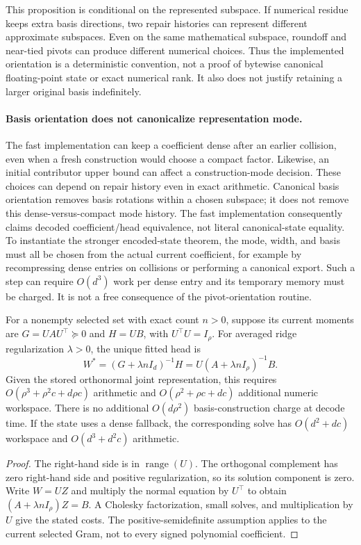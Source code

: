This proposition is conditional on the represented subspace. If numerical
residue keeps extra basis directions, two repair histories can represent
different approximate subspaces. Even on the same mathematical subspace,
roundoff and near-tied pivots can produce different numerical choices.
Thus the implemented orientation is a deterministic convention, not a
proof of bytewise canonical floating-point state or exact numerical rank.
It also does not justify retaining a larger original basis indefinitely.

\paragraph{Basis orientation does not canonicalize representation mode.}
The fast implementation can keep a coefficient dense after an earlier
collision, even when a fresh construction would choose a compact factor.
Likewise, an initial contributor upper bound can affect a construction-mode
decision. These choices can depend on repair history even in exact
arithmetic. Canonical basis orientation removes basis rotations within a
chosen subspace; it does not remove this dense-versus-compact mode history.
The fast implementation consequently claims decoded coefficient/head
equivalence, not literal canonical-state equality. To instantiate the
stronger encoded-state theorem, the mode, width, and basis must all be
chosen from the actual current coefficient, for example by recompressing
dense entries on collisions or performing a canonical export. Such a step
can require $O(d^3)$ work per dense entry and its temporary memory must be
charged. It is not a free consequence of the pivot-orientation routine.

\begin{proposition}
For a nonempty selected set with exact count $n>0$, suppose its current
moments are $G=UAU^\top\succeq0$ and $H=UB$, with $U^\top U=I_\rho$.
For averaged ridge regularization $\lambda>0$, the unique fitted head is
\[
 W^*=(G+\lambda nI_d)^{-1}H
     =U(A+\lambda nI_\rho)^{-1}B.
\]
Given the stored orthonormal joint representation, this requires
$O(\rho^3+\rho^2c+d\rho c)$ arithmetic and
$O(\rho^2+\rho c+dc)$ additional numeric workspace. There is no additional
$O(d\rho^2)$ basis-construction charge at decode time. If the state uses a
dense fallback, the corresponding solve has $O(d^2+dc)$ workspace and
$O(d^3+d^2c)$ arithmetic.
\end{proposition}
\begin{proof}
The right-hand side is in $\operatorname{range}(U)$. The orthogonal
complement has zero right-hand side and positive regularization, so its
solution component is zero. Write $W=UZ$ and multiply the normal equation
by $U^\top$ to obtain $(A+\lambda nI_\rho)Z=B$. A Cholesky factorization,
small solves, and multiplication by $U$ give the stated costs. The
positive-semidefinite assumption applies to the current selected Gram,
not to every signed polynomial coefficient.
\end{proof}


